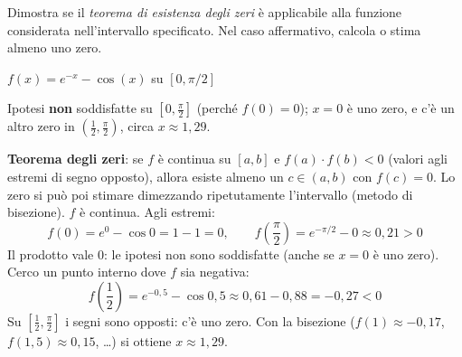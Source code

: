 \begin{question}[ID=3.5, subtitle={Teorema degli zeri per $e^{-x}-\cos x$ su $[0,\pi/2]$}, tags={continuità, teorema degli zeri}, difficulty=media]
Dimostra se il \textit{teorema di esistenza degli zeri} è applicabile alla funzione considerata nell'intervallo specificato. Nel caso affermativo, calcola o stima almeno uno zero.
\begin{center}
    $f(x) = e^{-x} - \cos(x)$ su $[0, \pi/2]$
\end{center}
\begin{solution}
Ipotesi \textbf{non} soddisfatte su $\left[0,\tfrac\pi2\right]$ (perché $f(0)=0$); $x=0$ è uno zero, e c'è un altro zero in $\left(\tfrac12,\tfrac\pi2\right)$, circa $x\approx1{,}29$.
\end{solution}
\begin{explanation}
\textbf{Teorema degli zeri}: se $f$ è continua su $[a,b]$ e $f(a)\cdot f(b)<0$ (valori agli estremi di segno opposto), allora esiste almeno un $c\in(a,b)$ con $f(c)=0$. Lo zero si può poi stimare dimezzando ripetutamente l'intervallo (metodo di bisezione).
$f$ è continua. Agli estremi:
\[ f(0)=e^0-\cos0=1-1=0, \qquad f\!\left(\dfrac\pi2\right)=e^{-\pi/2}-0\approx0{,}21>0 \]
Il prodotto vale $0$: le ipotesi non sono soddisfatte (anche se $x=0$ è uno zero). \\
Cerco un punto interno dove $f$ sia negativa:
\[ f\!\left(\dfrac12\right)=e^{-0{,}5}-\cos0{,}5\approx0{,}61-0{,}88=-0{,}27<0 \]
Su $\left[\tfrac12,\tfrac\pi2\right]$ i segni sono opposti: c'è uno zero. Con la bisezione ($f(1)\approx-0{,}17$, $f(1{,}5)\approx0{,}15$, \ldots) si ottiene $x\approx1{,}29$.
\end{explanation}
\end{question}


